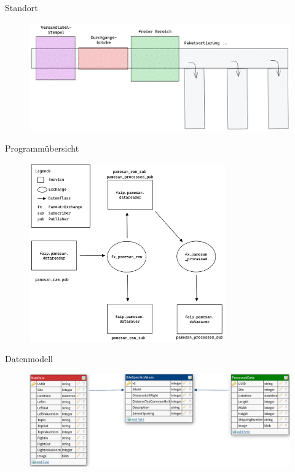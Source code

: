 \documentclass[10pt,ngerman]{beamer}
\begin{document}
\begin{frame}[fragile]{Standort}
  \begin{figure}[htpb]
    \centering
    \includegraphics[width=1\textwidth]{pics/Versandanlage.png}
  \end{figure}
\end{frame}


\begin{frame}[fragile]{Programmübersicht}
  \begin{figure}[htpb]
    \centering
    \includegraphics[width=0.75\textwidth]{pics/Architektur.png}
  \end{figure}
\end{frame}


\begin{frame}[fragile]{Datenmodell}
  \begin{figure}[htpb]
    \centering
    \includegraphics[width=1\textwidth]{pics/Tabellenmodell_schoen.png}
  \end{figure}
\end{frame}
\end{document}
